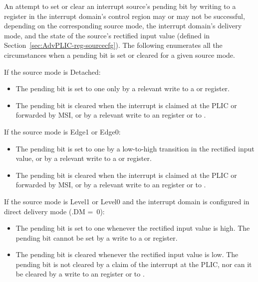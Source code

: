 An attempt to set or clear an interrupt source's pending bit by
writing to a register in the interrupt domain's control region
may or may not be successful, depending on the corresponding
source mode, the interrupt domain's delivery mode, and the
state of the source's rectified input value (defined in
Section~\ref{sec:AdvPLIC-reg-sourcecfg}).
The following enumerates all the circumstances when a pending bit is
set or cleared for a given source mode.

If the source mode is Detached:\nopagebreak
\begin{itemize}

\item
The pending bit is set to one only by a relevant write to a 
or  register.

\item
The pending bit is cleared when the interrupt is claimed at the PLIC or
forwarded by MSI, or by a relevant write to an  register
or to .

\end{itemize}

If the source mode is Edge1 or Edge0:
\begin{itemize}

\item
The pending bit is set to one by a low-to-high transition in the
rectified input value, or by a relevant write to a  or
 register.

\item
The pending bit is cleared when the interrupt is claimed at the PLIC or
forwarded by MSI, or by a relevant write to an  register
or to .

\end{itemize}

If the source mode is Level1 or Level0 and the interrupt domain is
configured in direct delivery mode (.DM =~0):
\begin{itemize}

\item
The pending bit is set to one whenever the rectified input value is
high.
The pending bit cannot be set by a write to a  or 
register.

\item
The pending bit is cleared whenever the rectified input value is low.
The pending bit is not cleared by a claim of the interrupt at the PLIC,
nor can it be cleared by a write to an  register or to
.

\end{itemize}

